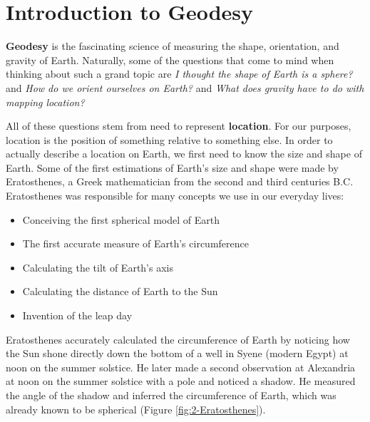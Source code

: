 \documentclass[
]{book}
\providecommand{\tightlist}{%
  \setlength{\itemsep}{0pt}\setlength{\parskip}{0pt}}
\begin{document}
\hypertarget{introduction-to-geodesy}{%
\section{Introduction to Geodesy}\label{introduction-to-geodesy}}

\textbf{Geodesy} is the fascinating science of measuring the shape, orientation, and gravity of Earth. Naturally, some of the questions that come to mind when thinking about such a grand topic are \emph{I thought the shape of Earth is a sphere?} and \emph{How do we orient ourselves on Earth?} and \emph{What does gravity have to do with mapping location?}

All of these questions stem from need to represent \textbf{location}. For our purposes, location is the position of something relative to something else. In order to actually describe a location on Earth, we first need to know the size and shape of Earth. Some of the first estimations of Earth's size and shape were made by Eratosthenes, a Greek mathematician from the second and third centuries B.C. Eratosthenes was responsible for many concepts we use in our everyday lives:

\begin{itemize}
\tightlist
\item
  Conceiving the first spherical model of Earth
\item
  The first accurate measure of Earth's circumference
\item
  Calculating the tilt of Earth's axis
\item
  Calculating the distance of Earth to the Sun
\item
  Invention of the leap day
\end{itemize}

Eratosthenes accurately calculated the circumference of Earth by noticing how the Sun shone directly down the bottom of a well in Syene (modern Egypt) at noon on the summer solstice. He later made a second observation at Alexandria at noon on the summer solstice with a pole and noticed a shadow. He measured the angle of the shadow and inferred the circumference of Earth, which was already known to be spherical (Figure \ref{fig:2-Eratosthenes}).
\end{document}
